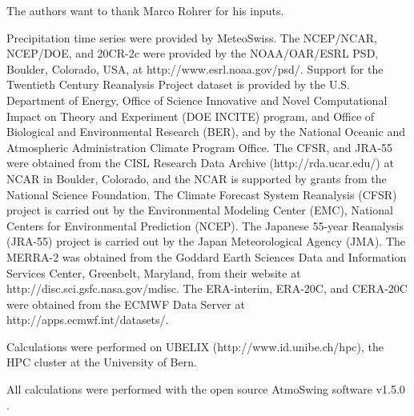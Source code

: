 \documentclass{ametsoc}
\begin{document}








%
\acknowledgments
The authors want to thank Marco Rohrer for his inputs.

Precipitation time series were provided by MeteoSwiss. The NCEP/NCAR, NCEP/DOE, and 20CR-2c were provided by the NOAA/OAR/ESRL PSD, Boulder, Colorado, USA, at http://www.esrl.noaa.gov/psd/. Support for the Twentieth Century Reanalysis Project dataset is provided by the U.S. Department of Energy, Office of Science Innovative and Novel Computational Impact on Theory and Experiment (DOE INCITE) program, and Office of Biological and Environmental Research (BER), and by the National Oceanic and Atmospheric Administration Climate Program Office. The CFSR, and JRA-55 were obtained from the CISL Research Data Archive (http://rda.ucar.edu/) at NCAR in Boulder, Colorado, and the NCAR is supported by grants from the National Science Foundation. The Climate Forecast System Reanalysis (CFSR) project is carried out by the Environmental Modeling Center (EMC), National Centers for Environmental Prediction (NCEP). The Japanese 55-year Reanalysis (JRA-55) project is carried out by the Japan Meteorological Agency (JMA). The MERRA-2 was obtained from the Goddard Earth Sciences Data and Information Services Center, Greenbelt, Maryland, from their website at http://disc.sci.gsfc.nasa.gov/mdisc. The ERA-interim, ERA-20C, and CERA-20C were obtained from the ECMWF Data Server at http://apps.ecmwf.int/datasets/. 

Calculations were performed on UBELIX (http://www.id.unibe.ch/hpc), the HPC cluster at the University of Bern.

All calculations were performed with the open source AtmoSwing software v1.5.0 \citep{Horton2017a}.


%
\end{document}
